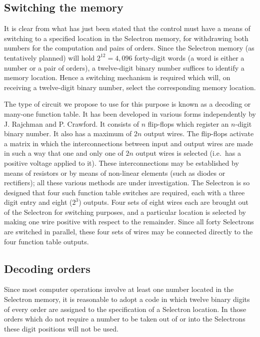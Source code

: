 \documentclass[12pt]{amsart}
\begin{document}
\subsection{Switching the memory}
It is clear from what has just been stated that the control must have a means of switching to a specified location in the Selectron memory, for withdrawing both numbers for the computation and pairs of orders. Since the Selectron memory (as tentatively planned) will hold $2^{12} = 4,096$ forty-digit words (a word is either a number or a pair of orders), a twelve-digit binary number suffices to identify a memory location. Hence a switching mechanism is required which will, on receiving a twelve-digit binary number, select the corresponding memory location.

The type of circuit we propose to use for this purpose is known as a decoding or many-one function table. It has been developed in various forms independently by J. Rajchman and P. Crawford. It consists of $n$ flip-flops which register an $n$-digit binary number. It also has a maximum of $2n$ output wires. The flip-flops activate a matrix in which the interconnections between input and output wires are made in such a way that one and only one of $2n$ output wires is selected (i.e.\ has a positive voltage applied to it). These interconnections may be established by means of resistors or by means of non-linear elements (such as diodes or rectifiers); all these various methods are under investigation. The Selectron is so designed that four such function table switches are required, each with a three digit entry and eight ($2^3$) outputs. Four sets of eight wires each are brought out of the Selectron for switching purposes, and a particular location is selected by making one wire positive with respect to the remainder. Since all forty Selectrons are switched in parallel, these four sets of wires may be connected directly to the four function table outputs.

\subsection{Decoding orders}
Since most computer operations involve at least one number located in the Selectron memory, it is reasonable to adopt a code in which twelve binary digits of every order are assigned to the specification of a Selectron location. In those orders which do not require a number to be taken out of or into the Selectrons these digit positions will not be used.
\end{document}
